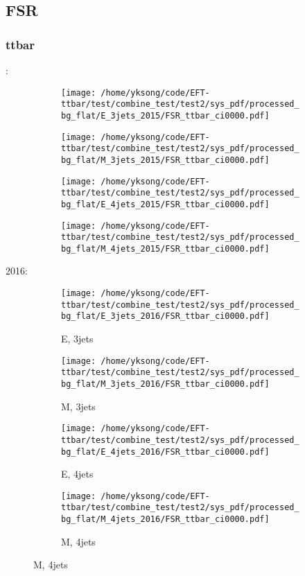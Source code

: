 \documentclass{beamer}
\begin{document}
\subsection{FSR}

\begin{frame}
\frametitle{ttbar}
\fontsize{5}{1}:
\begin{figure}
\centering
\begin{subfigure}[b]{0.24\textwidth}
\texttt{[image: /home/yksong/code/EFT-ttbar/test/combine\_test/test2/sys\_pdf/processed\_bg\_flat/E\_3jets\_2015/FSR\_ttbar\_ci0000.pdf]}
\end{subfigure}
\begin{subfigure}[b]{0.24\textwidth}
\texttt{[image: /home/yksong/code/EFT-ttbar/test/combine\_test/test2/sys\_pdf/processed\_bg\_flat/M\_3jets\_2015/FSR\_ttbar\_ci0000.pdf]}
\end{subfigure}
\begin{subfigure}[b]{0.24\textwidth}
\texttt{[image: /home/yksong/code/EFT-ttbar/test/combine\_test/test2/sys\_pdf/processed\_bg\_flat/E\_4jets\_2015/FSR\_ttbar\_ci0000.pdf]}
\end{subfigure}
\begin{subfigure}[b]{0.24\textwidth}
\texttt{[image: /home/yksong/code/EFT-ttbar/test/combine\_test/test2/sys\_pdf/processed\_bg\_flat/M\_4jets\_2015/FSR\_ttbar\_ci0000.pdf]}
\end{subfigure}
\end{figure}
2016:
\begin{figure}
\centering
\begin{subfigure}[b]{0.24\textwidth}
\texttt{[image: /home/yksong/code/EFT-ttbar/test/combine\_test/test2/sys\_pdf/processed\_bg\_flat/E\_3jets\_2016/FSR\_ttbar\_ci0000.pdf]}
\captionsetup{font=tiny}
\caption{E, 3jets}
\end{subfigure}
\begin{subfigure}[b]{0.24\textwidth}
\texttt{[image: /home/yksong/code/EFT-ttbar/test/combine\_test/test2/sys\_pdf/processed\_bg\_flat/M\_3jets\_2016/FSR\_ttbar\_ci0000.pdf]}
\captionsetup{font=tiny}
\caption{M, 3jets}
\end{subfigure}
\begin{subfigure}[b]{0.24\textwidth}
\texttt{[image: /home/yksong/code/EFT-ttbar/test/combine\_test/test2/sys\_pdf/processed\_bg\_flat/E\_4jets\_2016/FSR\_ttbar\_ci0000.pdf]}
\captionsetup{font=tiny}
\caption{E, 4jets}
\end{subfigure}
\begin{subfigure}[b]{0.24\textwidth}
\texttt{[image: /home/yksong/code/EFT-ttbar/test/combine\_test/test2/sys\_pdf/processed\_bg\_flat/M\_4jets\_2016/FSR\_ttbar\_ci0000.pdf]}
\captionsetup{font=tiny}
\caption{M, 4jets}
\end{subfigure}
\end{figure}
\end{frame}
\end{document}
